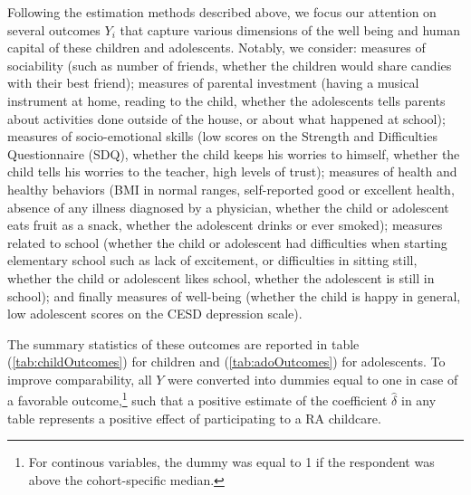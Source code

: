 \documentclass[12pt]{article}
\begin{document}
Following the estimation methods described above, we focus our attention on several outcomes $Y_{i}$ that capture various dimensions of the well being and human capital of these children and adolescents. Notably, we consider: measures of sociability (such as number of friends, whether the children would share candies with their best friend); measures of parental investment (having a musical instrument at home, reading to the child, whether the adolescents tells parents about activities done outside of the house, or about what happened at school); measures of socio-emotional skills (low scores on the Strength and Difficulties Questionnaire (SDQ), whether the child keeps his worries to himself, whether the child tells his worries to the teacher, high levels of trust); measures of health and healthy behaviors (BMI in normal ranges, self-reported good or excellent health, absence of any illness diagnosed by a physician, whether the child or adolescent eats fruit as a snack, whether the adolescent drinks or ever smoked); measures related to school (whether the child or adolescent had difficulties when starting elementary school such as lack of excitement, or difficulties in sitting still, whether the child or adolescent likes school, whether the adolescent is still in school); and finally measures of well-being (whether the child is happy in general, low adolescent scores on the CESD depression scale).

The summary statistics of these outcomes are reported in table (\ref{tab:childOutcomes}) for children and (\ref{tab:adoOutcomes}) for adolescents. To improve comparability, all $Y$ were converted into dummies equal to one in case of a favorable outcome,\footnote{For continous variables, the dummy was equal to 1 if the respondent was above the cohort-specific median.} such that a positive estimate of the coefficient $\hat{\delta}$ in any table represents a positive effect of participating to a RA childcare.
\end{document}
